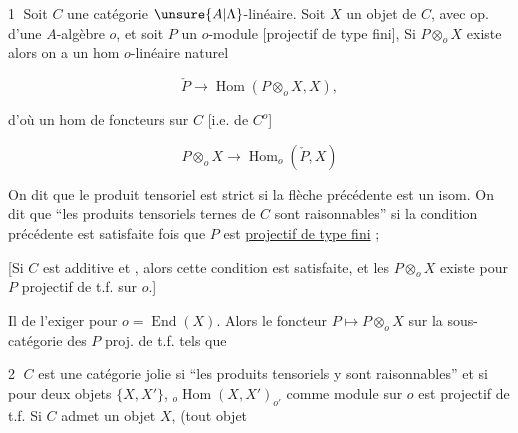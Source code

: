 
\textcircled{1} Soit $C$ une catégorie $\unsure{A|\Lambda}$-linéaire. Soit  $X$ un objet de
$C$, avec op. d'une $A$-algèbre $o$, et soit $P$ un
$o$-module  [projectif de type fini], Si $P\otimes_o X$ existe
alors on a un hom $o$-linéaire  naturel

\[
\check P\longrightarrow\operatorname{Hom}(P\otimes_o X,X),
\]

d'où un hom de  foncteurs  sur $C$ [i.e. de $C^o$]

\[
P\otimes_o X\longrightarrow\operatorname{Hom}_o(\check P,X)
\]

On dit que le produit tensoriel   est
strict si la flèche précédente est un isom.
On dit que  ``les produits tensoriels ternes
de $C$ sont raisonnables'' si la condition précédente
est satisfaite  fois que $P$ est \uline{projectif
de type fini} ;


  [Si $C$ est additive et ,
alors cette condition est satisfaite, et les
$P\otimes_o X$ existe pour  $P$ projectif de t.f. sur $o$.]

Il   de l'exiger pour $o=\operatorname{End}(X)$. Alors le foncteur
$P\longmapsto P\otimes_o X$ sur la sous-catégorie des $P$ proj. de t.f. tels que

\textcircled{2} $C$ est une catégorie   jolie si
 ``les produits tensoriels y
sont raisonnables'' et si pour deux objets
$\{X,X'\}$, $ {}_o\operatorname{Hom}(X,X')_{o'}$ comme module sur
$o$  est projectif de t.f.
Si $C$ admet un  objet $X$, (tout objet

